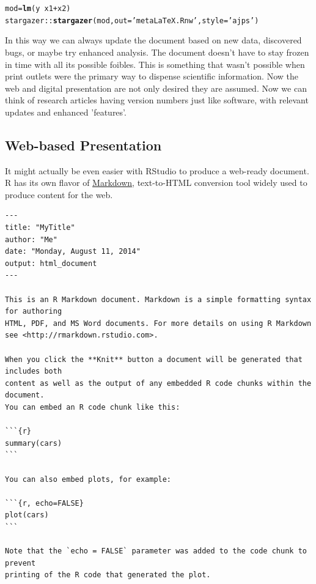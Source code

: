 \documentclass[english,nohyper,titlepage]{tufte-handout}\usepackage[]{graphicx}\usepackage[]{color}
\makeatletter
\newcommand{\hlstr}[1]{\textcolor[rgb]{0.192,0.494,0.8}{#1}}%
\newcommand{\hlopt}[1]{\textcolor[rgb]{0,0,0}{#1}}%
\newcommand{\hlstd}[1]{\textcolor[rgb]{0.345,0.345,0.345}{#1}}%
\newcommand{\hlkwb}[1]{\textcolor[rgb]{0.69,0.353,0.396}{#1}}%
\newcommand{\hlkwc}[1]{\textcolor[rgb]{0.333,0.667,0.333}{#1}}%
\newcommand{\hlkwd}[1]{\textcolor[rgb]{0.737,0.353,0.396}{\textbf{#1}}}%
\newenvironment{kframe}{%
 \def\at@end@of@kframe{}%
 \ifinner\ifhmode%
  \def\at@end@of@kframe{\end{minipage}}%
  \begin{minipage}{\columnwidth}%
 \fi\fi%
 \def\FrameCommand##1{\hskip\@totalleftmargin \hskip-\fboxsep
 \colorbox{shadecolor}{##1}\hskip-\fboxsep
     \hskip-\linewidth \hskip-\@totalleftmargin \hskip\columnwidth}%
 \MakeFramed {\advance\hsize-\width
   \@totalleftmargin\z@ \linewidth\hsize
   \@setminipage}}%
 {\par\unskip\endMakeFramed%
 \at@end@of@kframe}
\newenvironment{knitrout}{}{} %
\makeatother
\begin{document}
\begin{knitrout}\footnotesize
{}\color{fgcolor}\begin{kframe}
\begin{alltt}
\hlstd{mod} \hlkwb{=} \hlkwd{lm}\hlstd{(y} \hlopt{~} \hlstd{x1} \hlopt{+} \hlstd{x2)}
\hlstd{stargazer::}\hlkwd{stargazer}\hlstd{(mod,} \hlkwc{out}\hlstd{=}\hlstr{'metaLaTeX.Rnw'}\hlstd{,} \hlkwc{style}\hlstd{=}\hlstr{'ajps'}\hlstd{)}
\end{alltt}
\end{kframe}
\end{knitrout}




In this way we can always update the document based on new data, discovered bugs, or maybe try enhanced analysis.  The document doesn't have to stay frozen in time with all its possible foibles.  This is something that wasn't possible when print outlets were the primary way to dispense scientific information.  Now the web and digital presentation are not only desired they are assumed.  Now we can think of research articles having version numbers just like software, with relevant updates and enhanced 'features'.

\subsection{Web-based Presentation}
It might actually be even easier with RStudio to produce a web-ready document.  R has its own flavor of \href{http://daringfireball.net/projects/markdown/}{Markdown}, text-to-HTML conversion tool widely used to produce content for the web.


\begin{footnotesize}
\begin{verbatim}
---
title: "MyTitle"
author: "Me"
date: "Monday, August 11, 2014"
output: html_document
---

This is an R Markdown document. Markdown is a simple formatting syntax for authoring 
HTML, PDF, and MS Word documents. For more details on using R Markdown 
see <http://rmarkdown.rstudio.com>.

When you click the **Knit** button a document will be generated that includes both 
content as well as the output of any embedded R code chunks within the document. 
You can embed an R code chunk like this:

```{r}
summary(cars)
```

You can also embed plots, for example:

```{r, echo=FALSE}
plot(cars)
```

Note that the `echo = FALSE` parameter was added to the code chunk to prevent 
printing of the R code that generated the plot.
\end{verbatim}
\end{footnotesize}
\end{document}
